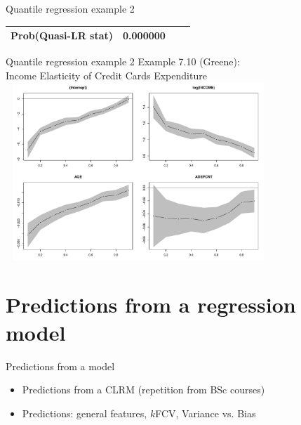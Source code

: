 \documentclass{beamer}
\begin{document}
\begin{frame}{Quantile regression example 2}
\begin{table}[]
\begin{tabular}{@{}lllll@{}}
Prob(Quasi-LR stat)                                                                                    & 0.000000                                                                                 & \multicolumn{2}{l}{}                                                                                                                                                              &                                                                                   \\ \bottomrule
\end{tabular}
\end{table}
\end{frame}
\begin{frame}{Quantile regression example 2}
Example 7.10 (Greene): \\Income Elasticity of Credit Cards Expenditure\\
\includegraphics[width=10cm, height=6.7cm]{img/quantil_regression.pdf}
\end{frame}
\section{Predictions from a regression model}
\begin{frame}{Predictions from a model}
    \bigskip
    \begin{itemize}
        \item Predictions from a CLRM (repetition from BSc courses)
        \bigskip
        \item Predictions: general features, $k$FCV, Variance vs. Bias
    \end{itemize}
\end{frame}
\end{document}
